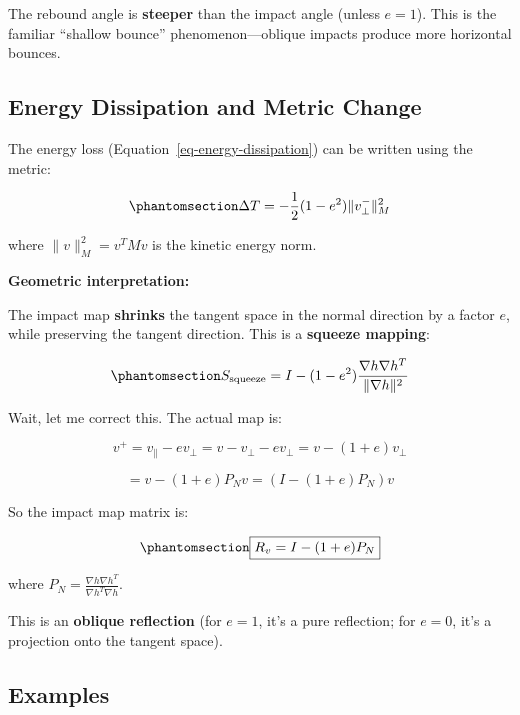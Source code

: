 \documentclass[
  letterpaper,
  DIV=11,
  numbers=noendperiod]{scrartcl}
\begin{document}
The rebound angle is \textbf{steeper} than the impact angle (unless
\(e = 1\)). This is the familiar ``shallow bounce'' phenomenon---oblique
impacts produce more horizontal bounces.

\subsection{Energy Dissipation and Metric
Change}\label{energy-dissipation-and-metric-change}

The energy loss (Equation~\ref{eq-energy-dissipation}) can be written
using the metric:

\begin{equation}\phantomsection\label{eq-energy-loss-metric}{
\Delta T = -\frac{1}{2}(1 - e^2) \|v_\perp^-\|_M^2
}\end{equation}

where \(\|v\|_M^2 = v^T M v\) is the kinetic energy norm.

\textbf{Geometric interpretation:}

The impact map \textbf{shrinks} the tangent space in the normal
direction by a factor \(e\), while preserving the tangent direction.
This is a \textbf{squeeze mapping}:

\begin{equation}\phantomsection\label{eq-squeeze-map}{
S_{\text{squeeze}} = I - (1 - e^2) \frac{\nabla h \nabla h^T}{\|\nabla h\|^2}
}\end{equation}

Wait, let me correct this. The actual map is:

\[
v^+ = v_\parallel - e v_\perp = v - v_\perp - e v_\perp = v - (1 + e) v_\perp
\]

\[
= v - (1 + e) P_N v = (I - (1+e) P_N) v
\]

So the impact map matrix is:

\begin{equation}\phantomsection\label{eq-impact-map-matrix}{
\boxed{R_v = I - (1 + e) P_N}
}\end{equation}

where \(P_N = \frac{\nabla h \nabla h^T}{\nabla h^T \nabla h}\).

This is an \textbf{oblique reflection} (for \(e = 1\), it's a pure
reflection; for \(e = 0\), it's a projection onto the tangent space).

\subsection{Examples}\label{examples}
\end{document}
